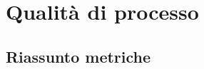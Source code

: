 \documentclass[a4paper, oneside, openany, dvipsnames, table]{article}
\begin{document}
% 		
% 		
% 		
% 	
% 	

\section{Qualità di processo}
	
		

		

		\subsection{Riassunto metriche}
		
\end{document}
